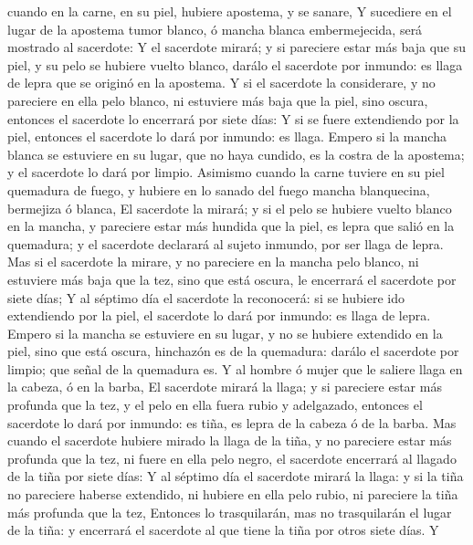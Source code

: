 cuando en la carne, en su piel, hubiere apostema, y se sanare,
 Y sucediere en el lugar de la apostema tumor blanco, ó
mancha blanca embermejecida, será mostrado al sacerdote: 
Y el sacerdote mirará; y si pareciere estar más baja que su piel, y su
pelo se hubiere vuelto blanco, darálo el sacerdote por inmundo: es llaga
de lepra que se originó en la apostema.  Y si el
sacerdote la considerare, y no pareciere en ella pelo blanco, ni
estuviere más baja que la piel, sino oscura, entonces el sacerdote lo
encerrará por siete días:  Y si se fuere extendiendo por
la piel, entonces el sacerdote lo dará por inmundo: es llaga.
 Empero si la mancha blanca se estuviere en su lugar, que
no haya cundido, es la costra de la apostema; y el sacerdote lo dará por
limpio.  Asimismo cuando la carne tuviere en su piel
quemadura de fuego, y hubiere en lo sanado del fuego mancha blanquecina,
bermejiza ó blanca,  El sacerdote la mirará; y si el pelo
se hubiere vuelto blanco en la mancha, y pareciere estar más hundida que
la piel, es lepra que salió en la quemadura; y el sacerdote declarará al
sujeto inmundo, por ser llaga de lepra.  Mas si el
sacerdote la mirare, y no pareciere en la mancha pelo blanco, ni
estuviere más baja que la tez, sino que está oscura, le encerrará el
sacerdote por siete días;  Y al séptimo día el sacerdote
la reconocerá: si se hubiere ido extendiendo por la piel, el sacerdote
lo dará por inmundo: es llaga de lepra.  Empero si la
mancha se estuviere en su lugar, y no se hubiere extendido en la piel,
sino que está oscura, hinchazón es de la quemadura: darálo el sacerdote
por limpio; que señal de la quemadura es.  Y al hombre ó
mujer que le saliere llaga en la cabeza, ó en la barba, 
El sacerdote mirará la llaga; y si pareciere estar más profunda que la
tez, y el pelo en ella fuera rubio y adelgazado, entonces el sacerdote
lo dará por inmundo: es tiña, es lepra de la cabeza ó de la barba.
 Mas cuando el sacerdote hubiere mirado la llaga de la
tiña, y no pareciere estar más profunda que la tez, ni fuere en ella
pelo negro, el sacerdote encerrará al llagado de la tiña por siete días:
 Y al séptimo día el sacerdote mirará la llaga: y si la
tiña no pareciere haberse extendido, ni hubiere en ella pelo rubio, ni
pareciere la tiña más profunda que la tez,  Entonces lo
trasquilarán, mas no trasquilarán el lugar de la tiña: y encerrará el
sacerdote al que tiene la tiña por otros siete días.  Y
